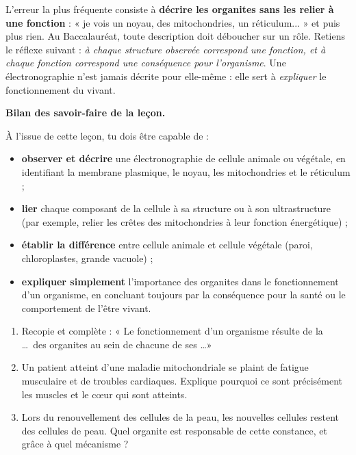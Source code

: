 \documentclass[11pt]{article}
\begin{document}
\begin{attention}
L'erreur la plus fréquente consiste à \textbf{décrire les organites sans les relier à une fonction} : « je vois un noyau, des mitochondries, un réticulum... » et puis plus rien. Au Baccalauréat, toute description doit déboucher sur un rôle. Retiens le réflexe suivant : \emph{à chaque structure observée correspond une fonction, et à chaque fonction correspond une conséquence pour l'organisme}. Une électronographie n'est jamais décrite pour elle-même : elle sert à \emph{expliquer} le fonctionnement du vivant.
\end{attention}

\textbf{Bilan des savoir-faire de la leçon.}\par

À l'issue de cette leçon, tu dois être capable de :
\begin{itemize}
\item \textbf{observer et décrire} une électronographie de cellule animale ou végétale, en identifiant la membrane plasmique, le noyau, les mitochondries et le réticulum ;
\item \textbf{lier} chaque composant de la cellule à sa structure ou à son ultrastructure (par exemple, relier les crêtes des mitochondries à leur fonction énergétique) ;
\item \textbf{établir la différence} entre cellule animale et cellule végétale (paroi, chloroplastes, grande vacuole) ;
\item \textbf{expliquer simplement} l'importance des organites dans le fonctionnement d'un organisme, en concluant toujours par la conséquence pour la santé ou le comportement de l'être vivant.
\end{itemize}

\begin{exercice}
\begin{enumerate}
\item Recopie et complète : « Le fonctionnement d'un organisme résulte de la \ldots\ des organites au sein de chacune de ses \ldots »
\item Un patient atteint d'une maladie mitochondriale se plaint de fatigue musculaire et de troubles cardiaques. Explique pourquoi ce sont précisément les muscles et le cœur qui sont atteints.
\item Lors du renouvellement des cellules de la peau, les nouvelles cellules restent des cellules de peau. Quel organite est responsable de cette constance, et grâce à quel mécanisme ?
\end{enumerate}
\end{exercice}
\end{document}
